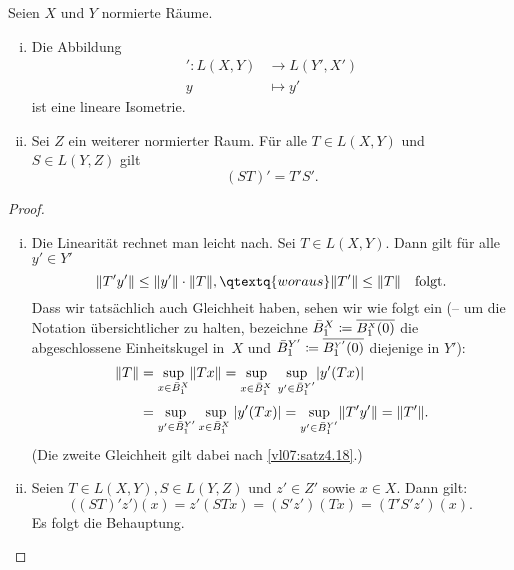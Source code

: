 \begin{thSatz}
    Seien $X$ und $Y$ normierte Räume. 
    \begin{enumerate}[(i)]
        \item
            Die Abbildung
            \begin{align*}
                {}'\colon L(X,Y) &\to L(Y',X')  \\
                y &\mapsto y'
            \end{align*}
            ist eine lineare Isometrie.
            
        \item 
            Sei $Z$ ein weiterer normierter Raum.
            Für alle $T\in L(X,Y)$ und $S\in L(Y,Z)$ gilt
            \[ (ST)' = T'S'  . \]
    \end{enumerate}
\end{thSatz}

\begin{proof}\hfill
    \begin{enumerate}[(i)]
        \item
            Die Linearität rechnet man leicht nach. Sei $T\in L(X,Y)$. Dann gilt
            für alle $y'\in Y'$
            \[ \norm{T'y'} \leq \norm{y'} \cdot \norm{T}, \qtextq{woraus} 
                \norm{T'} \leq \norm{T} \quad\text{folgt}
            . \]
            Dass wir tatsächlich auch Gleichheit haben, sehen wir wie folgt ein
            (-- um die Notation übersichtlicher zu halten, bezeichne $\bar B^X_1
            \coloneqq \overline{B^{\scriptscriptstyle X}_1(0)}$ die
            abgeschlossene Einheitskugel in~$X$ und $\bar B^{Y'}_1 \coloneqq
            \overline{B^{\scriptscriptstyle Y'}_1(0)}$ diejenige in $Y'$):
            \begin{align*}
                \norm{T} 
                &= \sup_{x\in \bar B^X_1} \norm{Tx}
                 = \adjustlimits
                   \sup_{x\in \bar B^X_1\;} 
                    \sup_{y'\in \bar B^{Y'}_1} \abs{y'(Tx)}
                \\[2pt]
                &= \adjustlimits
                   \sup_{y'\in \bar B^{Y'}_1} 
                    \sup_{x\in \bar B^X_1\;} \abs{y'(Tx)}
                 = \sup_{y'\in \bar B^{Y'}_1} \norm{T'y'}
                 = \norm{T'}
            . \end{align*}
            (Die zweite Gleichheit gilt dabei nach \cref{vl07:satz4.18}.)
        
        \item
            Seien $T\in L(X,Y), S\in L(Y,Z)$ und $z'\in Z'$ sowie $x\in X$. Dann
            gilt:
            \[ \bigl( (ST)' z' \bigr)(x) = z'(STx) 
                = (S'z')(Tx) = (T'S'z')(x)  
            . \]
            Es folgt die Behauptung.
    \end{enumerate}
\end{proof}
        
